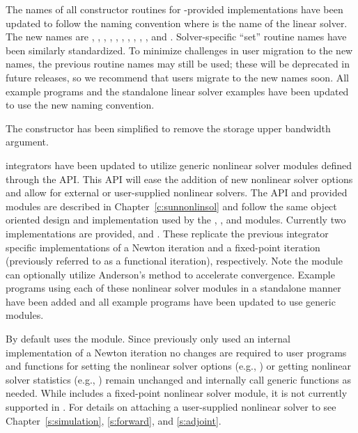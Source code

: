 The names of all constructor routines for {\sundials}-provided
{\sunlinsol} implementations have been updated to follow the naming convention
 where \id{*} is the name of the linear solver. The new names
are
,
,
,
,\newline
{},
,
,
,
,
, and
.  Solver-specific ``set'' routine names have
been similarly standardized.  To minimize challenges in user migration
to the new names, the previous routine names may still be used; these
will be deprecated in future releases, so we recommend that users
migrate to the new names soon. All {\idas} example programs and the standalone
linear solver examples have been updated to use the new naming convention.

The  constructor has been simplified to remove the
storage upper bandwidth argument.

{\sundials} integrators have been updated to utilize generic nonlinear solver
modules defined through the {\sunnonlinsol} API. This API will ease the addition
of new nonlinear solver options and allow for external or user-supplied
nonlinear solvers. The {\sunnonlinsol} API and {\sundials} provided modules are
described in Chapter~\ref{c:sunnonlinsol} and follow the same object oriented
design and implementation used by the {\nvector}, {\sunmatrix}, and {\sunlinsol}
modules. Currently two {\sunnonlinsol} implementations are provided,
{\sunnonlinsolnewton} and {\sunnonlinsolfixedpoint}. These replicate the
previous integrator specific implementations of a Newton iteration and a
fixed-point iteration (previously referred to as a functional iteration),
respectively. Note the {\sunnonlinsolfixedpoint} module can optionally utilize
Anderson's method to accelerate convergence. Example programs using each of
these nonlinear solver modules in a standalone manner have been added and all
{\idas} example programs have been updated to use generic {\sunnonlinsol}
modules.

By default {\idas} uses the {\sunnonlinsolnewton} module. Since {\idas} previously
only used an internal implementation of a Newton iteration no changes are
required to user programs and functions for setting the nonlinear solver options
(e.g., ) or getting nonlinear solver statistics (e.g.,
) remain unchanged and internally call generic
{\sunnonlinsol} functions as needed. While {\sundials} includes a fixed-point
nonlinear solver module, it is not currently supported in {\idas}. For details on
attaching a user-supplied nonlinear solver to {\idas} see
Chapter~\ref{s:simulation}, \ref{s:forward}, and \ref{s:adjoint}.

